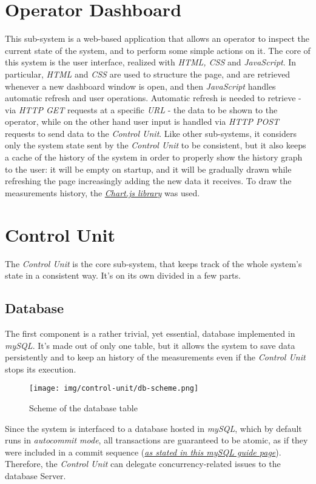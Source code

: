 \documentclass[a4paper,12pt]{report}
\begin{document}
	\section{Operator Dashboard}
	This sub-system is a web-based application that allows an operator to inspect the current state of the system, and to perform some simple actions on it. The core of this system is the user interface, realized with \textit{HTML, CSS} and \textit{JavaScript}.
	\newline In particular, \textit{HTML} and \textit{CSS} are used to structure the page, and are retrieved whenever a new dashboard window is open, and then \textit{JavaScript} handles automatic refresh and user operations. Automatic refresh is needed to retrieve - via \textit{HTTP GET} requests at a specific \textit{URL} - the data to be shown to the operator, while on the other hand user input is handled via \textit{HTTP POST} requests to send data to the \textit{Control Unit}.
	\newline Like other sub-systems, it considers only the system state sent by the \textit{Control Unit} to be consistent, but it also keeps a cache of the history of the system in order to properly show the history graph to the user: it will be empty on startup, and it will be gradually drawn while refreshing the page increasingly adding the new data it receives.
	\newline To draw the measurements history, the \href{https://www.w3schools.com/ai/ai_chartjs.asp}{\textit{Chart.js library}} was used.
	\section{Control Unit}
	The \textit{Control Unit} is the core sub-system, that keeps track of the whole system's state in a consistent way. It's on its own divided in a few parts.
		\subsection{Database}
		The first component is a rather trivial, yet essential, database implemented in \textit{mySQL}. It's made out of only one table, but it allows the system to save data persistently and to keep an history of the measurements even if the \textit{Control Unit} stops its execution.
		\begin{figure}[H]
			\centering{}
			\texttt{[image: img/control-unit/db-scheme.png]}
			\caption{Scheme of the database table}
			\label{img:control-unit/db-scheme}
		\end{figure}
		Since the system is interfaced to a database hosted in \textit{mySQL}, which by default runs in \textit{autocommit mode}, all transactions are guaranteed to be atomic, as if they were included in a commit sequence (\href{https://dev.mysql.com/doc/refman/8.4/en/commit.html}{\textit{as stated in this mySQL guide page}}). Therefore, the \textit{Control Unit} can delegate concurrency-related issues to the database Server.
\end{document}
